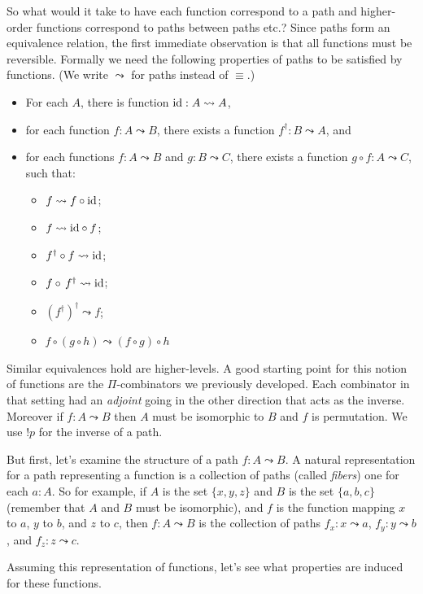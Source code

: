 \documentclass[11pt]{article}
\newcommand{\cp}{\circ}                 %
\newcommand{\id}{\textrm{\rm id}}       %
\renewcommand{\path}{\leadsto}
\newcommand{\adjoint}[1]{#1^{\dagger}}
\begin{document}
So what would it take to have each function correspond to a path and
higher-order functions correspond to paths between paths etc.? Since paths
form an equivalence relation, the first immediate observation is that all
functions must be reversible. Formally we need the following properties of
paths to be satisfied by functions. (We write $\path$ for paths instead of
$\equiv$.)

\begin{itemize}
\item For each $A$, there is function $\id : A \path A$, 

\item for each function $f: A \path B$, there exists a function $\adjoint{f}
  : B \path A$, and

\item for each functions $f : A \path B$ and $g : B \path C$, there exists a
  function $g \cp f : A \path C$, such that:

\begin{itemize}
\item $f \path f \cp \id$;
\item $f \path \id \cp f$;
\item $\adjoint{f} \cp f \path \id$;
\item $f \cp \, \adjoint{f} \path \id$;
\item $\adjoint{(\adjoint{f})} \path f$;
\item $f \cp (g \cp h) \path (f \cp g) \cp h$
\end{itemize}
\end{itemize}
Similar equivalences hold are higher-levels. A good starting point for this
notion of functions are the $\Pi$-combinators we previously developed. Each
combinator in that setting had an \emph{adjoint} going in the other direction
that acts as the inverse. Moreover if $f : A \path B$ then $A$ must be
isomorphic to $B$ and $f$ is permutation. We use $!p$ for the inverse of a
path.

But first, let's examine the structure of a path $f : A \path B$. A natural
representation for a path representing a function is a collection of paths
(called \emph{fibers}) one for each $a : A$. So for example, if $A$ is the
set $\{ x , y , z \}$ and $B$ is the set $\{ a , b , c \}$ (remember that $A$
and $B$ must be isomorphic), and $f$ is the function mapping $x$ to $a$, $y$
to $b$, and $z$ to $c$, then $f : A \path B$ is the collection of paths $f_x
: x \path a$, $f_y : y \path b$, and $f_z : z \path c$.

Assuming this representation of functions, let's see what properties are
induced for these functions. 
\end{document}
